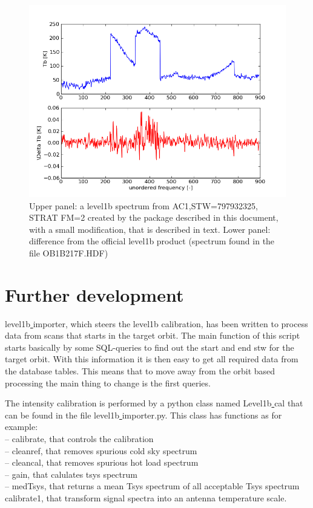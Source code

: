 \documentclass[12pt]{article}
\begin{document}
\begin{figure}[!t]
\centering
\includegraphics[scale=0.5]{spectrum.png}
\caption{Upper panel: a level1b spectrum from AC1,STW=797932325,
STRAT FM=2 created by the package described in this document,
with a small modification, that is described in text.
Lower panel: difference from the official level1b product
(spectrum found in the file OB1B217F.HDF) }
\label{fig:odin1}
\end{figure}



\section{Further development}
level1b\underline{ }importer, which steers the level1b
calibration, has been written to process data from scans
that starts in the target orbit.
The main function of this script starts basically by some
SQL-queries to find out the start and end stw for the target orbit.
With this information it is then easy to get all required
data from the database tables.
This means that to move away from the orbit based processing
the main thing to change is the first queries.

The intensity calibration is performed by a python class
named Level1b\underline{ }cal that can
be found in the file level1b\underline{ }importer.py.
This class has functions as for example:\\
-- calibrate, that controls the calibration\\
-- cleanref, that removes spurious cold sky spectrum\\
-- cleancal, that removes spurious hot load spectrum\\
-- gain, that calulates tsys spectrum\\
-- medTsys, that returns a mean Tsys spectrum of all acceptable
Tsys spectrum\\ 
calibrate1, that transform signal spectra into an antenna temperature
scale.
 
\end{document}
